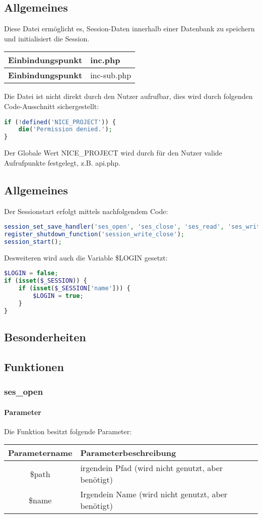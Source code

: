 \subsection{Allgemeines} Diese Datei ermöglicht es, Session-Daten innerhalb einer Datenbank zu speichern und initialisiert die Session.
\begin{table}[H]
	\begin{tabular}{|c|p{11cm}|}
		\hline
		\textbf{Einbindungspunkt} & inc.php \\ \hline
		\textbf{Einbindungspunkt} & inc-sub.php \\ \hline
	\end{tabular}
\end{table}
Die Datei ist nicht direkt durch den Nutzer aufrufbar, dies wird durch folgenden Code-Ausschnitt sichergestellt:
\begin{lstlisting}[language=php]
if (!defined('NICE_PROJECT')) {
	die('Permission denied.');
}
\end{lstlisting}
Der Globale Wert {\glqq NICE\_PROJECT\grqq} wird durch für den Nutzer valide Aufrufpunkte festgelegt, z.B. {\glqq api.php\grqq}.
\newpage
\subsection{Allgemeines}
Der Sessionstart erfolgt mittels nachfolgendem Code:
\begin{lstlisting}[language=php]
session_set_save_handler('ses_open', 'ses_close', 'ses_read', 'ses_write', 'ses_destroy', 'ses_gc');
register_shutdown_function('session_write_close');
session_start();
\end{lstlisting}
Desweiteren wird auch die Variable \$LOGIN gesetzt:
\begin{lstlisting}[language=php]
$LOGIN = false;
if (isset($_SESSION)) {
	if (isset($_SESSION['name'])) {
		$LOGIN = true;
	}
}
\end{lstlisting}
\subsection{Besonderheiten}
\newpage
\subsection{Funktionen}
\subsubsection{ses\_open}
\paragraph{Parameter} Die Funktion besitzt folgende Parameter:
\begin{table}[H]
	\begin{tabular}{|c|p{11cm}|}
		\hline
		\textbf{Parametername} & \textbf{Parameterbeschreibung} \\ \hline
		\$path & irgendein Pfad (wird nicht genutzt, aber benötigt) \\ \hline
		\$name & Irgendein Name (wird nicht genutzt, aber benötigt) \\ \hline
	\end{tabular}
\end{table}
